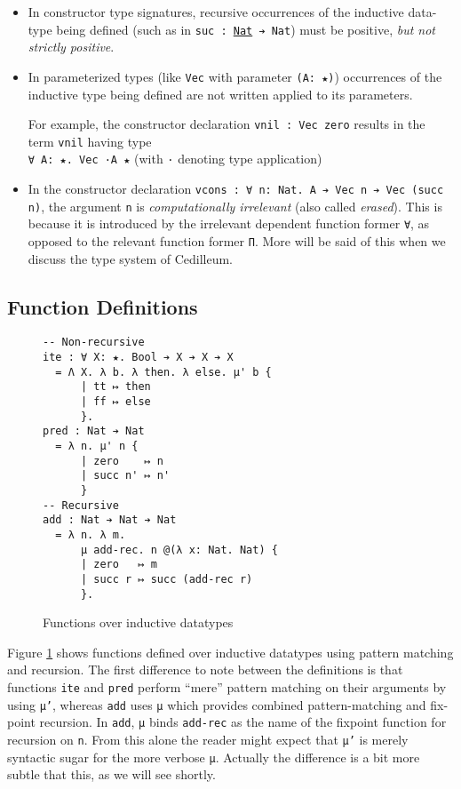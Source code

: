 \documentclass{article}
\begin{document}
\begin{itemize}
\item In constructor type signatures, recursive occurrences of the inductive
  data-type being defined (such as in \texttt{suc : \underline{Nat} ➔ Nat}) must
  be positive, \textit{but not strictly positive}.
\item In parameterized types (like \texttt{Vec} with parameter \texttt{(A: ★)})
  occurrences of the inductive type being defined are not written applied to
  its parameters.
  
  For example, the constructor declaration \texttt{vnil : Vec zero} results in
  the term \texttt{vnil} having type \\ \texttt{∀ A: ★. Vec ·A ★} (with \texttt{·}
  denoting type application)
\item In the constructor declaration \texttt{vcons : ∀ n: Nat. A ➔ Vec n ➔ Vec
    (succ n)}, the argument \texttt{n} is \textit{computationally irrelevant}
  (also called \textit{erased}). This is because it is introduced by the
  irrelevant dependent function former \texttt{∀}, as opposed to the relevant
  function former \texttt{Π}. More will be said of this when we discuss the type
  system of Cedilleum.
\end{itemize}

\subsection{Function Definitions}
\begin{figure}[h]
\begin{verbatim}
-- Non-recursive
ite : ∀ X: ★. Bool ➔ X ➔ X ➔ X
  = Λ X. λ b. λ then. λ else. μ' b {
      | tt ↦ then
      | ff ↦ else
      }.
pred : Nat ➔ Nat
  = λ n. μ' n {
      | zero    ↦ n
      | succ n' ↦ n'
      }
-- Recursive
add : Nat ➔ Nat ➔ Nat
  = λ n. λ m.
      μ add-rec. n @(λ x: Nat. Nat) {
      | zero   ↦ m
      | succ r ↦ succ (add-rec r)
      }.
\end{verbatim}
  \caption{Functions over inductive datatypes}
  \label{fig:ex-data-fun}
\end{figure}

Figure \ref{fig:ex-data-fun} shows functions defined over inductive datatypes
using pattern matching and recursion. The first difference to note between the
definitions is that functions \texttt{ite} and \texttt{pred} perform ``mere''
pattern matching on their arguments by using \texttt{μ'}, whereas \texttt{add} uses
\texttt{μ} which provides combined pattern-matching and fix-point recursion. In
\texttt{add}, \texttt{μ} binds \texttt{add-rec} as the name of the fixpoint
function for recursion on \texttt{n}. From this alone the reader might expect
that \texttt{μ'} is merely syntactic sugar for the more verbose \texttt{μ}.
Actually the difference is a bit more subtle that this, as we will see shortly.
\end{document}

